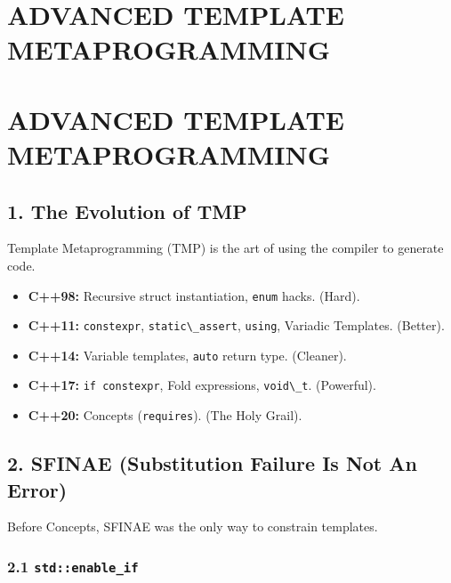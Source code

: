 \hypertarget{advanced-template-metaprogramming}{%
\chapter{ADVANCED TEMPLATE
METAPROGRAMMING}\label{advanced-template-metaprogramming}}

\hypertarget{advanced-template-metaprogramming-1}{%
\chapter{ADVANCED TEMPLATE
METAPROGRAMMING}\label{advanced-template-metaprogramming-1}}

\hypertarget{the-evolution-of-tmp}{%
\section{1. The Evolution of TMP}\label{the-evolution-of-tmp}}

Template Metaprogramming (TMP) is the art of using the compiler to
generate code.

\begin{itemize}
\tightlist
\item
  \textbf{C++98:} Recursive struct instantiation,
  \passthrough{\lstinline!enum!} hacks. (Hard).
\item
  \textbf{C++11:} \passthrough{\lstinline!constexpr!},
  \passthrough{\lstinline!static\_assert!},
  \passthrough{\lstinline!using!}, Variadic Templates. (Better).
\item
  \textbf{C++14:} Variable templates, \passthrough{\lstinline!auto!}
  return type. (Cleaner).
\item
  \textbf{C++17:} \passthrough{\lstinline!if constexpr!}, Fold
  expressions, \passthrough{\lstinline!void\_t!}. (Powerful).
\item
  \textbf{C++20:} Concepts (\passthrough{\lstinline!requires!}). (The
  Holy Grail).
\end{itemize}

\hypertarget{sfinae-substitution-failure-is-not-an-error}{%
\section{2. SFINAE (Substitution Failure Is Not An
Error)}\label{sfinae-substitution-failure-is-not-an-error}}

Before Concepts, SFINAE was the only way to constrain templates.

\hypertarget{stdenable_if}{%
\subsection{\texorpdfstring{2.1
\texttt{std::enable\_if}}{2.1 std::enable\_if}}\label{stdenable_if}}

